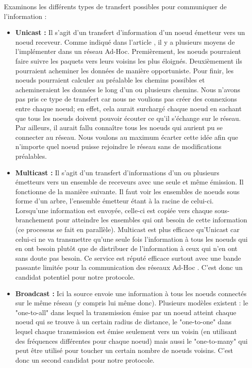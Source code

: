 \documentclass[journal, a4paper]{IEEEtran}
\begin{document}
        Examinons les différents types de transfert possibles pour communiquer de l'information :
        \begin{itemize}
                \item \textbf{Unicast :} Il s'agit d'un transfert d'information d'un noeud émetteur vers un noeud receveur. Comme indiqué dans l'article \cite{2014WASa}, il y a plusieurs moyens 
                de l'implémenter dans un réseau Ad-Hoc. Premièrement, les noeuds pourraient faire suivre les paquets vers leurs voisins les plus éloignés. Deuxièmement 
                ils pourraient acheminer les données de manière opportuniste. Pour finir, les noeuds pourraient calculer au préalable les chemins possibles et 
                achemineraient les données le long d'un ou plusieurs chemins.
                Nous n'avons pas pris ce type de transfert car nous ne voulions pas créer des connexions entre chaque noeud; en effet, cela aurait surchargé chaque noeud en sachant que 
                tous les noeuds doivent pouvoir écouter ce qu'il s'échange sur le réseau. Par ailleurs, il aurait fallu connaître tous les noeuds qui aurient pu se connecter au réseau. Nous 
                voulons au maximum écarter cette idée afin que n'importe quel noeud puisse rejoindre le réseau sans de modifications préalables.
                \item \textbf{Multicast :} Il s'agit d'un transfert d'informations d'un ou plusieurs émetteurs vers un ensemble de receveurs avec une seule et même émission. Il fonctionne de la 
                manière suivante. Il faut voir les ensembles de noeuds sous forme d'un arbre, l'ensemble émetteur étant à la racine de celui-ci. Lorsqu'une information est envoyée, 
                celle-ci est copiée vers chaque sous-branchement pour atteindre les ensembles qui ont besoin de cette information (ce processus se fait en parallèle). 
                Multicast est plus efficace qu'Unicast car celui-ci ne va transmettre qu'une seule fois l'information à tous les noeuds qui en ont besoin plutôt que 
                de distribuer de l'information à ceux qui n'en ont sans doute pas besoin.
                Ce service est réputé efficace surtout avec une bande passante limitée pour la communication des réseaux 
                Ad-Hoc \cite{XiangMa2012AoMR}. C'est donc un candidat potentiel pour notre protocole.
                \item \textbf{Broadcast :} Ici la source envoie une information à tous les noeuds connectés sur le même réseau (y compris lui même donc). Plusieurs modèles existent \cite{2004Mahn} : 
                le "one-to-all" dans lequel la transmission émise par un noeud atteint chaque noeud qui se trouve à un certain radius de distance, le "one-to-one" 
                dans lequel chaque transmission est émise seulement vers un voisin (en utilisant des fréquences différentes pour chaque noeud) mais aussi le "one-to-many" qui peut 
                être utilisé pour toucher un certain nombre de noeuds voisins. C'est donc un second candidat pour notre protocole. \\
        \end{itemize}
\end{document}
